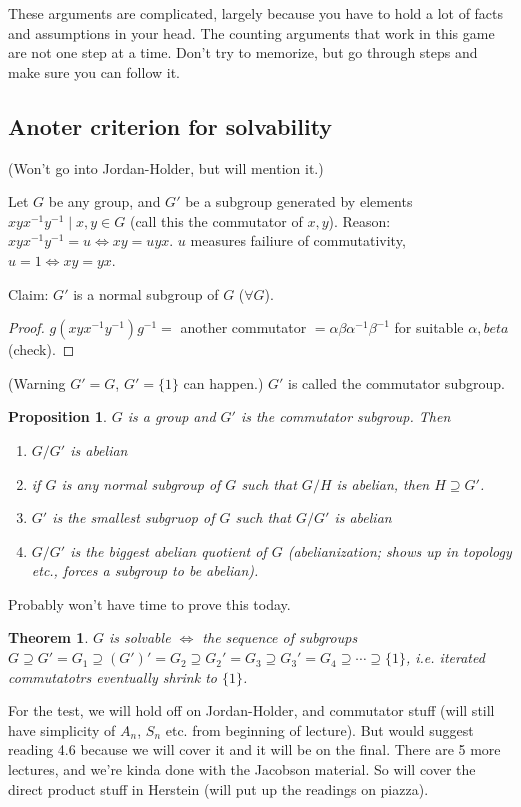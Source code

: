 \documentclass{article}
\theoremstyle{plain}
\newtheorem{theorem}{Theorem}
\newtheorem{proposition}{Proposition}
\theoremstyle{remark}
\begin{document}
These arguments are complicated, largely because you have to hold
a lot of facts and assumptions in your head.
The counting arguments that work in this game are not one step at a time.
Don't try to memorize, but go through steps and make sure you can follow it.

\subsection{Anoter criterion for solvability}
(Won't go into Jordan-Holder, but will mention it.)

Let $G$ be any group, and $G'$ be a subgroup generated by elements
$xyx^{-1}y^{-1} \mid x,y \in G$ (call this the commutator of $x,y$).
Reason: $xyx^{-1}y^{-1} = u \iff xy = uyx$.
$u$ measures failiure of commutativity, $u = 1 \iff xy = yx$.

Claim: $G'$ is a normal subgroup of $G$ ($\forall G$).
\begin{proof}
	$g(xyx^{-1}y^{-1})g^{-1} = $ another commutator
	$= \alpha \beta \alpha^{-1}\beta^{-1}$ for suitable $\alpha,beta$ (check).
\end{proof}
(Warning $G' = G$, $G' = \{1\}$ can happen.)
$G'$ is called the commutator subgroup.
\begin{proposition}
	$G$ is a group and $G'$ is the commutator subgroup. Then
	\begin{enumerate}
		\item[i)] $G/G'$ is abelian
		\item[ii)] if $G$ is any normal subgroup of $G$ such that $G/H$
			is abelian, then $H \supseteq G'$.
		\item[iii)] $G'$ is the smallest subgruop of $G$ such that $G/G'$ is abelian
		\item[iv)] $G/G'$ is the biggest abelian quotient of $G$
			(abelianization; shows up in topology etc.,
			forces a subgroup to be abelian).
	\end{enumerate}
\end{proposition}
Probably won't have time to prove this today.

\begin{theorem}
	$G$ is solvable $\iff$ the sequence of subgroups
	$G \supseteq G' = G_1 \supseteq (G')' = G_2 \supseteq
	G_2' = G_3 \supseteq G_3' = G_4 \supseteq \cdots \supseteq \{1\}$,
	i.e. iterated commutatotrs eventually shrink to $\{1\}$.
\end{theorem}

For the test, we will hold off on Jordan-Holder, and commutator stuff
(will still have simplicity of $A_n$, $S_n$ etc. from beginning of lecture).
But would suggest reading 4.6 because we will cover it and it will be on the final.
There are 5 more lectures, and we're kinda done with the Jacobson material.
So will cover the direct product stuff in Herstein (will put up the readings on piazza).
\end{document}
